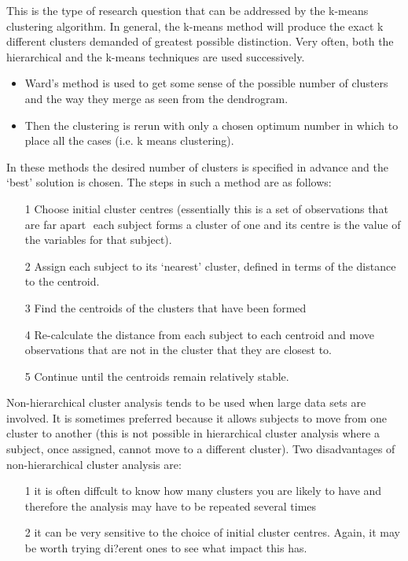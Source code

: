 This is the type of research question that can be addressed by the k-means clustering algorithm. In general, the k-means method will produce the exact k different clusters demanded of greatest possible distinction. Very often, both the hierarchical and the k-means techniques are used successively.
\begin{itemize}
\item Ward's method is used to get some sense of the possible number of clusters and the way they merge as seen from the dendrogram.
\item Then the clustering is rerun with only a chosen optimum number in which to place all
the cases (i.e. k means clustering).
\end{itemize}
In these methods the desired number of clusters is specified in advance and the `best' solution
is chosen. The steps in such a method are as follows:
\begin{itemize}
\item[1] Choose initial cluster centres (essentially this is a set of observations that are far apart
 each subject forms a cluster of one and its centre is the value of the variables for
that subject).
\item[2] Assign each subject to its `nearest' cluster, defined in terms of the distance to the
centroid.
\item[3] Find the centroids of the clusters that have been formed
\item[4] Re-calculate the distance from each subject to each centroid and move observations that
are not in the cluster that they are closest to.
\item[5] Continue until the centroids remain relatively stable.
\end{itemize}
Non-hierarchical cluster analysis tends to be used when large data sets are involved. It is
sometimes preferred because it allows subjects to move from one cluster to another (this is
not possible in hierarchical cluster analysis where a subject, once assigned, cannot move to a
different cluster). Two disadvantages of non-hierarchical cluster analysis are: 
\begin{itemize}
\item[1]it is often
diffcult to know how many clusters you are likely to have and therefore the analysis may have
to be repeated several times 
\item[2] it can be very sensitive to the choice of initial cluster centres. Again, it may be worth trying di?erent ones to see what impact this has.
\end{itemize}
